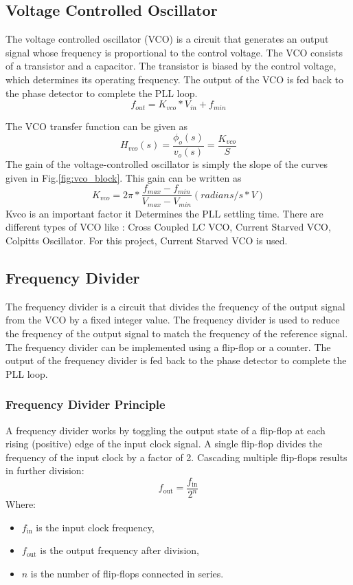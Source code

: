 \subsection{Voltage Controlled Oscillator}
The voltage controlled oscillator (VCO) is a circuit that generates an output signal whose frequency is proportional to the control voltage. The VCO consists of a transistor and a capacitor. The transistor is biased by the control voltage, which determines its operating frequency. The output of the VCO is fed back to the phase detector to complete the PLL loop.
\begin{equation}
	\label{eq:vco_char}
	f_{out} = K_{vco} * V_{in} + f_{min}
\end{equation}

The VCO transfer function can be given as
\begin{equation}
	\label{eq:vco_tf}
	H_{vco}(s) = \frac{\phi_{o}(s)}{v_{o}(s)} = \frac{K_{vco}}{S}
\end{equation}
The gain of the voltage-controlled oscillator is simply the slope of the curves given in Fig.\ref{fig:vco_block}. This gain can be written as
\begin{equation}
	\label{eq:vco_gain}
	K_{vco} = 2\pi  * \frac{f_{max} - f_{min}}{V_{max} - V_{min}}(radians/s * V)
\end{equation}
Kvco is an important factor it Determines the PLL settling time.
There are different types of VCO like : Cross Coupled LC VCO, Current Starved VCO, Colpitts Oscillator. For this project, Current Starved VCO is used.
\subsection{Frequency Divider}
The frequency divider is a circuit that divides the frequency of the output signal from the VCO by a fixed integer value. The frequency divider is used to reduce the frequency of the output signal to match the frequency of the reference signal. The frequency divider can be implemented using a flip-flop or a counter. The output of the frequency divider is fed back to the phase detector to complete the PLL loop.
\subsubsection*{Frequency Divider Principle}
A frequency divider works by toggling the output state of a flip-flop at each rising (positive) edge of the input clock signal. A single flip-flop divides the frequency of the input clock by a factor of 2. Cascading multiple flip-flops results in further division:
\[
f_{\text{out}} = \frac{f_{\text{in}}}{2^n}
\]
Where:
\begin{itemize}
    \item $f_{\text{in}}$ is the input clock frequency,
    \item $f_{\text{out}}$ is the output frequency after division,
    \item $n$ is the number of flip-flops connected in series.
\end{itemize}
